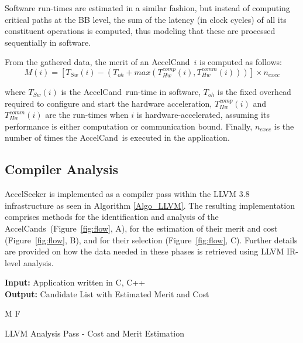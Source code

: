 \documentclass[]{usiinfthesis}
\newcommand{\candidate}{{AccelCand}}
\newcommand{\candidates}{{AccelCand}s}
\begin{document}
Software run-times are estimated in a similar fashion, but instead of computing critical paths at the BB 
level, the sum of the latency (in clock cycles) of all its constituent operations is computed, thus modeling 
that these are processed sequentially in software.\par

From the gathered data, the merit of an \candidate\ $i$ is computed as
follows:
\begin{equation*}
M(i) = [ T_{Sw}(i) - (T_{oh}+max(T_{Hw}^{comp}(i),T_{Hw}^{comm}(i))) ] \times n_{exec}
\label{eq:inference}
\end{equation*}

where $T_{Sw}(i)$ is the \candidate\ run-time in software, $T_{oh}$ is
the fixed overhead required to configure and start the hardware
acceleration, $T_{Hw}^{comp}(i)$ and $T_{Hw}^{comm}(i)$ are the
run-times when $i$ is hardware-accelerated, assuming its performance
is either computation or communication bound.  Finally, $n_{exec}$ is
the number of times the \candidate\ is executed in the application.

\subsection{Compiler Analysis}
\label{sec:llvm_analysis}

AccelSeeker is implemented as a compiler pass within the LLVM
3.8~\cite{LattnerMar04} infrastructure as seen in Algorithm \ref{Algo_LLVM}. 
The resulting implementation
comprises methods for the identification and analysis of the
\candidates\ (Figure~\ref{fig:flow}, A), for the estimation of
their merit and cost (Figure~\ref{fig:flow}, B), and for their
selection (Figure~\ref{fig:flow}, C). Further details are provided 
on how the data needed in these phases is retrieved using LLVM IR-level 
analysis.\par

\begin{algorithm}[t]
\begin{flushleft}
\textbf{Input:}  Application written in C, C++\\
\textbf{Output:} Candidate List with Estimated Merit and Cost\\
\end{flushleft}
\begin{algorithmic}[1]
 {M}
\EndFunction
\State
{} {F}
 \State
\EndFunction
\end{algorithmic}
\caption{LLVM Analysis Pass - Cost and Merit Estimation} 
\label{Algo_LLVM}
\end{algorithm}
\end{document}
